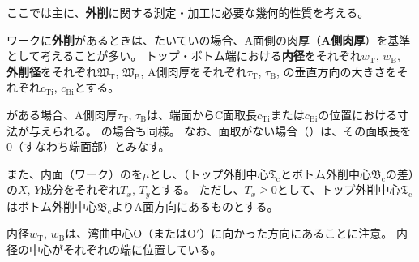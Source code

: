 

ここでは主に、\textbf{外削}に関する測定・加工に必要な幾何的性質を考える。

ワークに\textbf{外削}があるときは、たいていの場合、A面側の肉厚（\textbf{A側肉厚}）を基準として考えることが多い。
トップ・ボトム端における\textbf{内径}をそれぞれ$w_\mathrm T$, $w_\mathrm B$, \textbf{外削径}をそれぞれ$\mathfrak W_\mathrm T$, $\mathfrak W_\mathrm B$, A側肉厚をそれぞれ$\tau_\mathrm T$, $\tau_\mathrm B$, \EndFaceInChamfer の垂直方向の大きさをそれぞれ$c_\mathrm{Ti}$, $c_\mathrm{Bi}$とする。
\begin{hosoku}
\EndFaceInChamfer がある場合、A側肉厚$\tau_\mathrm T$, $\tau_\mathrm B$は、端面からC面取長$c_\mathrm{Ti}$または$c_\mathrm{Bi}$の位置における寸法が与えられる。
\EndFaceInRoundChamferRadius の場合も同様。
なお、面取がない場合（）は、その面取長を0（すなわち端面部）とみなす。
\end{hosoku}
また、内面（ワーク）の\textbf{\PlatingThk}を$\mu$とし、\CenterlineEndFaceDif（トップ外削中心$\mathfrak T_\mathrm c$とボトム外削中心$\mathfrak B_\mathrm c$の差）の$X$, $Y$成分をそれぞれ$T_x$, $T_y$とする。
ただし、$T_x \geq 0$として、トップ外削中心$\mathfrak T_\mathrm c$はボトム外削中心$\mathfrak B_\mathrm c$よりA面方向にあるものとする。
\begin{hosoku}
内径$w_\mathrm T$, $w_\mathrm B$は、湾曲中心O（またはO$'$）に向かった方向にあることに注意。
内径の中心がそれぞれの端に位置している。
\end{hosoku}



